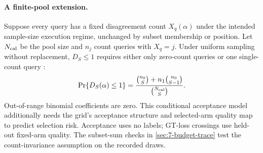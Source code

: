 \paragraph{A finite-pool extension.}
Suppose every query has a fixed disagreement count $X_q(\alpha)$ under
the intended sample-size execution regime, unchanged by subset membership
or position. Let $N_{\rm cal}$ be the pool size and $n_j$ count queries with $X_q=j$.
Under uniform sampling without replacement, $D_S\leq1$ requires either
only zero-count queries or one single-count query \cite{nist_hypergeometric}:
\begin{equation}
 \Pr\{D_S(\alpha)\leq1\}
 =\frac{\binom{n_0}{S}+n_1\binom{n_0}{S-1}}{\binom{N_{\rm cal}}{S}}.
 \label{eq:6-finite-pool}
\end{equation}
Out-of-range binomial coefficients are zero. This conditional acceptance
model additionally needs the grid's acceptance structure and selected-arm
quality map to predict selection risk. Acceptance uses no labels;
GT-loss crossings use held-out fixed-arm quality. The subset-sum checks
in \cref{sec:7-budget-trace} test the count-invariance assumption on the
recorded draws.
